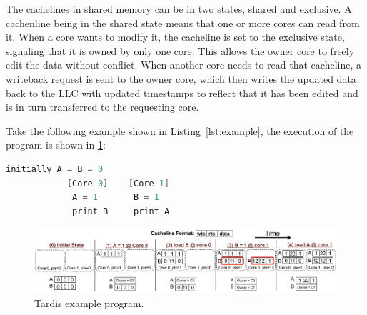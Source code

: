 \documentclass[12pt]{article}
\begin{document}
The cachelines in shared memory can be in two states, shared and exclusive. A cachenline being in the shared state means that one or more cores can read from it. When a core wants to modify it, the cacheline is set to the exclusive state, signaling that it is owned by only one core. This allows the owner core to freely edit the data without conflict. When another core needs to read that cacheline, a writeback request is sent to the owner core, which then writes the updated data back to the LLC with updated timestamps to reflect that it has been edited and is in turn transferred to the requesting core.




Take the following example shown in Listing~\ref{lst:example}, the 
execution of the program is shown in \cref{fig:example}:

\vspace{-.1in}
\begin{lstlisting}[language=C,label={lst:example},caption={Example 
Program}]
			  initially A = B = 0
			[Core 0]	[Core 1]
			 A = 1		 B = 1
			 print B	 print A
\end{lstlisting}


\begin{figure}
	\centering
	\includegraphics[width=0.95\columnwidth]{figs/example.pdf}
	\caption{ Tardis example program.}
	\label{fig:example}
\end{figure}
\end{document}
